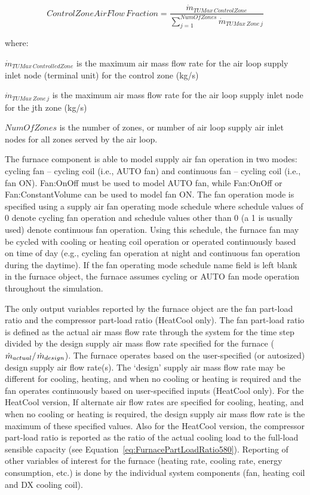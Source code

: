 \begin{equation}
Control Zone Air Flow\,Fraction = \frac{{{{\dot m}_{TUMax\,ControlZone}}}}{{\sum\limits_{j = 1}^{NumOfZones} {{{\dot m}_{TUMax\,Zone\,j}}} }}
\end{equation}

where:

\({\dot m_{TUMax\,ControlledZone}}\) is the maximum air mass flow rate for the air loop supply inlet node (terminal unit) for the control zone (kg/s)

\({\dot m_{TUMax\,Zone\,j}}\) is the maximum air mass flow rate for the air loop supply inlet node for the jth zone (kg/s)

\(NumOfZones\) is the number of zones, or number of air loop supply air inlet nodes for all zones served by the air loop.

The furnace component is able to model supply air fan operation in two modes: cycling fan -- cycling coil (i.e., AUTO fan) and continuous fan -- cycling coil (i.e., fan ON). Fan:OnOff must be used to model AUTO fan, while Fan:OnOff or Fan:ConstantVolume can be used to model fan ON. The fan operation mode is specified using a supply air fan operating mode schedule where schedule values of 0 denote cycling fan operation and schedule values other than 0 (a 1 is usually used) denote continuous fan operation. Using this schedule, the furnace fan may be cycled with cooling or heating coil operation or operated continuously based on time of day (e.g., cycling fan operation at night and continuous fan operation during the daytime). If the fan operating mode schedule name field is left blank in the furnace object, the furnace assumes cycling or AUTO fan mode operation throughout the simulation.

The only output variables reported by the furnace object are the fan part-load ratio and the compressor part-load ratio (HeatCool only). The fan part-load ratio is defined as the actual air mass flow rate through the system for the time step divided by the design supply air mass flow rate specified for the furnace (\({{{{\dot m}_{actual}}} \mathord{\left/ {\vphantom {{{{\dot m}_{actual}}} {{{\dot m}_{design}}}}} \right. } {{{\dot m}_{design}}}}\)). The furnace operates based on the user-specified (or autosized) design supply air flow rate(s). The `design' supply air mass flow rate may be different for cooling, heating, and when no cooling or heating is required and the fan operates continuously based on user-specified inputs (HeatCool only). For the HeatCool version, If alternate air flow rates are specified for cooling, heating, and when no cooling or heating is required, the design supply air mass flow rate is the maximum of these specified values. Also for the HeatCool version, the compressor part-load ratio is reported as the ratio of the actual cooling load to the full-load sensible capacity (see Equation~\ref{eq:FurnacePartLoadRatio580}). Reporting of other variables of interest for the furnace (heating rate, cooling rate, energy consumption, etc.) is done by the individual system components (fan, heating coil and DX cooling coil).

